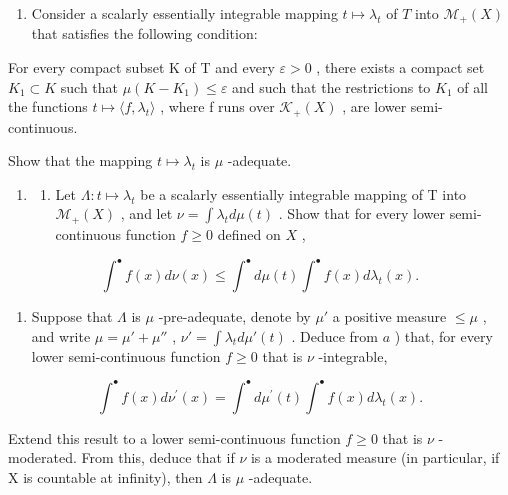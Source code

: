 \begin{enumerate}
\def\labelenumi{\alph{enumi})}
\setcounter{enumi}{1}
\tightlist
\item
  Consider a scalarly essentially integrable mapping \(t \mapsto \lambda_t\) of \(T\) into \(\mathcal{M}_+(X)\) that satisfies the following condition:
\end{enumerate}

For every compact subset K of T and every \(\varepsilon > 0\) , there exists a compact set \(K_{1} \subset K\) such that \(\mu(K - K_{1}) \leqslant \varepsilon\) and such that the restrictions to \(K_{1}\) of all the functions \(t \mapsto \langle f, \lambda_{t} \rangle\) , where f runs over \(\mathcal{K}_{+}(X)\) , are lower semi-continuous.

Show that the mapping \(t \mapsto \lambda_t\) is \(\mu\) -adequate.

\begin{enumerate}
\def\labelenumi{\arabic{enumi})}
\setcounter{enumi}{6}
\tightlist
\item
  \begin{enumerate}
  \def\labelenumii{\alph{enumii})}
  \tightlist
  \item
    Let \(\Lambda : t \mapsto \lambda_t\) be a scalarly essentially integrable mapping of T into \(\mathcal{M}_{+}(X)\) , and let \(\nu = \int \lambda_t d\mu(t)\) . Show that for every lower semi-continuous function \(f \geqslant 0\) defined on \(X\) ,
  \end{enumerate}
\end{enumerate}

\[
\int^ {\bullet} f (x) d \nu (x) \leqslant \int^ {\bullet} d \mu (t) \int^ {\bullet} f (x) d \lambda_ {t} (x).
\]

\begin{enumerate}
\def\labelenumi{\alph{enumi})}
\setcounter{enumi}{1}
\tightlist
\item
  Suppose that \(\Lambda\) is \(\mu\) -pre-adequate, denote by \(\mu'\) a positive measure \(\leqslant \mu\) , and write \(\mu = \mu' + \mu''\) , \(\nu' = \int \lambda_t d\mu'(t)\) . Deduce from \(a\) ) that, for every lower semi-continuous function \(f \geqslant 0\) that is \(\nu\) -integrable,
\end{enumerate}

\[
\int^ {\bullet} f (x) d \nu^ {\prime} (x) = \int^ {\bullet} d \mu^ {\prime} (t) \int^ {\bullet} f (x) d \lambda_ {t} (x).
\]

Extend this result to a lower semi-continuous function \(f \geqslant 0\) that is \(\nu\) -moderated. From this, deduce that if \(\nu\) is a moderated measure (in particular, if X is countable at infinity), then \(\Lambda\) is \(\mu\) -adequate.

